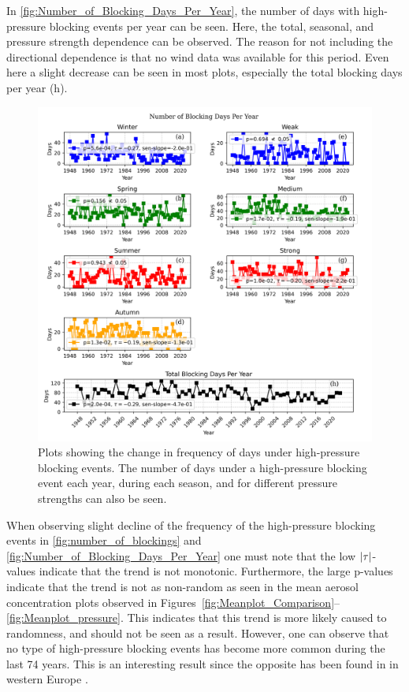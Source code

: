 In \autoref{fig:Number_of_Blocking_Days_Per_Year}, the number of days with high-pressure blocking events per year can be seen. Here, the total, seasonal, and pressure strength dependence can be observed. The reason for not including the directional dependence is that no wind data was available for this period. Even here a slight decrease can be seen in most plots, especially the total blocking days per year (h). 


\begin{figure}[H]
    \centering
    \includegraphics[width=\textwidth]{Figures/blocking_days_per_year_all.png}
    \caption{Plots showing the change in frequency of days under high-pressure blocking events. The number of days under a high-pressure blocking event each year, during each season, and for different pressure strengths can also be seen.}
    \label{fig:Number_of_Blocking_Days_Per_Year}
\end{figure}

When observing slight decline of the frequency of the high-pressure blocking events in \autoref{fig:number_of_blockings} and \autoref{fig:Number_of_Blocking_Days_Per_Year} one must note that the low $\left| \tau \right|$-values indicate that the trend is not monotonic. Furthermore, the large p-values indicate that the trend is not as non-random as seen in the mean aerosol concentration plots observed in Figures~\ref{fig:Meanplot_Comparison}--\ref{fig:Meanplot_pressure}. This indicates that this trend is more likely caused to randomness, and should not be seen as a result. However, one can observe that no type of high-pressure blocking events has become more common during the last 74 years. This is an interesting result since the opposite has been found in in western Europe \cite{lupoAtmosphericBlockingEvents2020}. 
